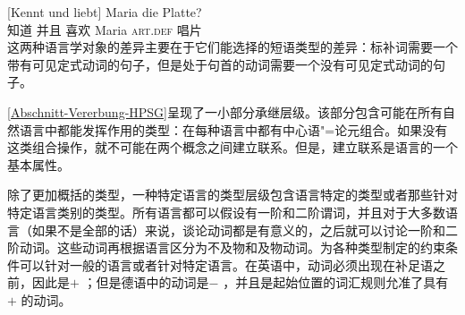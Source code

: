 \ex 
\gll {}[Kennt und liebt] Maria die Platte?\\
	 {}\spacebr{}知道 并且 喜欢 Maria \textsc{art}.\textsc{def} 唱片\\
\zl
这两种语言学对象的差异主要在于它们能选择的短语类型的差异：标补词需要一个带有可见定式动词的句子，但是处于句首的动词需要一个没有可见定式动词的句子。

\ref{Abschnitt-Vererbung-HPSG}呈现了一小部分承继层级。该部分包含可能在所有自然语言中都能发挥作用的类型：在每种语言中都有中心语"=论元组合。如果没有这类组合操作，就不可能在两个概念之间建立联系。但是，建立联系是语言的一个基本属性。

除了更加概括的类型，一种特定语言的类型层级包含语言特定的类型或者那些针对特定语言类别的类型。所有语言都可以假设有一阶和二阶谓词，并且对于大多数语言（如果不是全部的话）来说，谈论动词都是有意义的，之后就可以讨论一阶和二阶动词。这些动词再根据语言区分为不及物和及物动词。为各种类型制定的约束条件可以针对一般的语言或者针对特定语言。在英语中，动词必须出现在补足语之前，因此是\initialv $+$ ；但是德语中的动词是\initialv $-$ ，并且是起始位置的词汇规则允准了具有\initialv $+$ 的动词。

